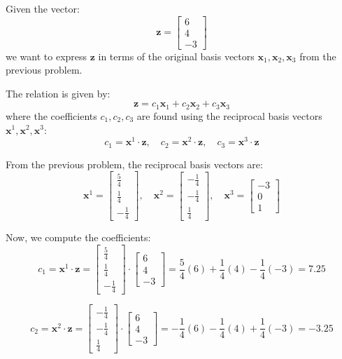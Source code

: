 \documentclass{article}
\begin{document}
Given the vector:
\[
\mathbf{z} = \begin{bmatrix} 6 \\ 4 \\ -3 \end{bmatrix}
\]
we want to express \( \mathbf{z} \) in terms of the original basis vectors \( \mathbf{x}_1, \mathbf{x}_2, \mathbf{x}_3 \) from the previous problem. 

The relation is given by:
\[
\mathbf{z} = c_1 \mathbf{x}_1 + c_2 \mathbf{x}_2 + c_3 \mathbf{x}_3
\]
where the coefficients \( c_1, c_2, c_3 \) are found using the reciprocal basis vectors \( \mathbf{x}^1, \mathbf{x}^2, \mathbf{x}^3 \):
\[
c_1 = \mathbf{x}^1 \cdot \mathbf{z}, \quad c_2 = \mathbf{x}^2 \cdot \mathbf{z}, \quad c_3 = \mathbf{x}^3 \cdot \mathbf{z}
\]

From the previous problem, the reciprocal basis vectors are:
\[
\mathbf{x}^1 = \begin{bmatrix} \frac{5}{4} \\ \frac{1}{4} \\ -\frac{1}{4} \end{bmatrix}, \quad
\mathbf{x}^2 = \begin{bmatrix} -\frac{1}{4} \\ -\frac{1}{4} \\ \frac{1}{4} \end{bmatrix}, \quad
\mathbf{x}^3 = \begin{bmatrix} -3 \\ 0 \\ 1 \end{bmatrix}
\]

Now, we compute the coefficients:
\[
c_1 = \mathbf{x}^1 \cdot \mathbf{z} = \begin{bmatrix} \frac{5}{4} \\ \frac{1}{4} \\ -\frac{1}{4} \end{bmatrix} \cdot \begin{bmatrix} 6 \\ 4 \\ -3 \end{bmatrix} = \frac{5}{4}(6) + \frac{1}{4}(4) - \frac{1}{4}(-3) = 7.25
\]

\[
c_2 = \mathbf{x}^2 \cdot \mathbf{z} = \begin{bmatrix} -\frac{1}{4} \\ -\frac{1}{4} \\ \frac{1}{4} \end{bmatrix} \cdot \begin{bmatrix} 6 \\ 4 \\ -3 \end{bmatrix} = -\frac{1}{4}(6) - \frac{1}{4}(4) + \frac{1}{4}(-3) = -3.25
\]
\end{document}
